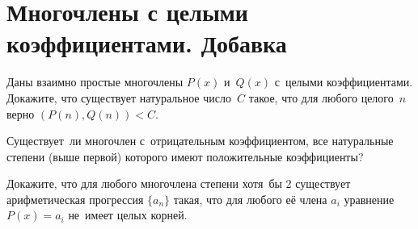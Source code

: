 
\section*{Многочлены с целыми коэффициентами. Добавка}




\begin{problems}

\item
Даны взаимно простые многочлены $P(x)$ и~$Q(x)$ с~целыми коэффициентами.
Докажите, что существует натуральное число~$C$ такое, что для любого целого~$n$
верно $(P(n), Q(n)) < C$.

\item
Существует~ли многочлен с~отрицательным коэффициентом, все натуральные степени
(выше первой) которого имеют положительные коэффициенты?

\item
Докажите, что для любого многочлена степени хотя~бы 2 существует арифметическая
прогрессия $\{ a_n \}$ такая, что для любого её члена $a_i$ уравнение
$P(x) = a_i$ не~имеет целых корней.

\end{problems}

